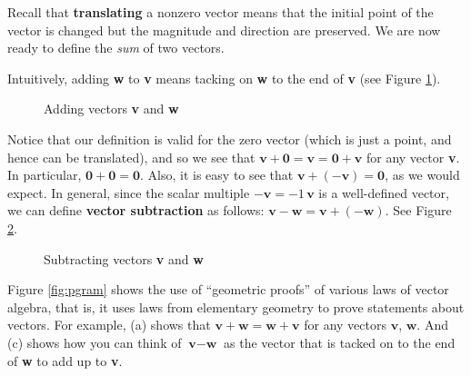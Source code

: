 Recall that \textbf{translating} a nonzero vector means that the initial point of the vector
is changed but the magnitude and direction are preserved. We are now ready to define
the \emph{sum} of two vectors.

\newpage
Intuitively, adding \textbf{w} to \textbf{v} means tacking on \textbf{w} to the end of \textbf{v} (see Figure
\ref{fig:sum}).

\begin{figure}[h]
 \centering
 \qquad
 \qquad
 \caption[]{\quad Adding vectors \textbf{v} and \textbf{w}}
 \label{fig:sum}
\end{figure}

Notice that our definition is valid for the zero vector (which is just a point, and hence can be translated), and
so we see that $\textbf{v} + \textbf{0} = \textbf{v} = \textbf{0} + \textbf{v}$ for any vector \textbf{v}. In
particular, $\textbf{0} + \textbf{0} = \textbf{0}$. Also, it is easy to see that $\textbf{v} + (-\textbf{v}) =
\textbf{0}$, as we would expect. In general, since the scalar multiple $-\textbf{v} = -1 \,\textbf{v}$ is a
well-defined vector, we can define \textbf{vector subtraction} as follows:
$\textbf{v} - \textbf{w} = \textbf{v} + (-\textbf{w})$. See Figure \ref{fig:subtract}.

\begin{figure}[h]
 \centering
 \qquad
 \qquad
 \caption[]{\quad Subtracting vectors \textbf{v} and \textbf{w}}
 \label{fig:subtract}
\end{figure}

Figure \ref{fig:pgram} shows the use of ``geometric proofs'' of various laws of vector algebra, that is, it
uses laws from elementary geometry to prove statements about vectors.
For example, (a) shows that $\textbf{v} + \textbf{w} = \textbf{w} + \textbf{v}$ for any vectors $\textbf{v}$,
$\textbf{w}$. And (c) shows how you can think of $\textbf{v} - \textbf{w}$ as the vector that is tacked on to the end of
\textbf{w} to add up to \textbf{v}.

